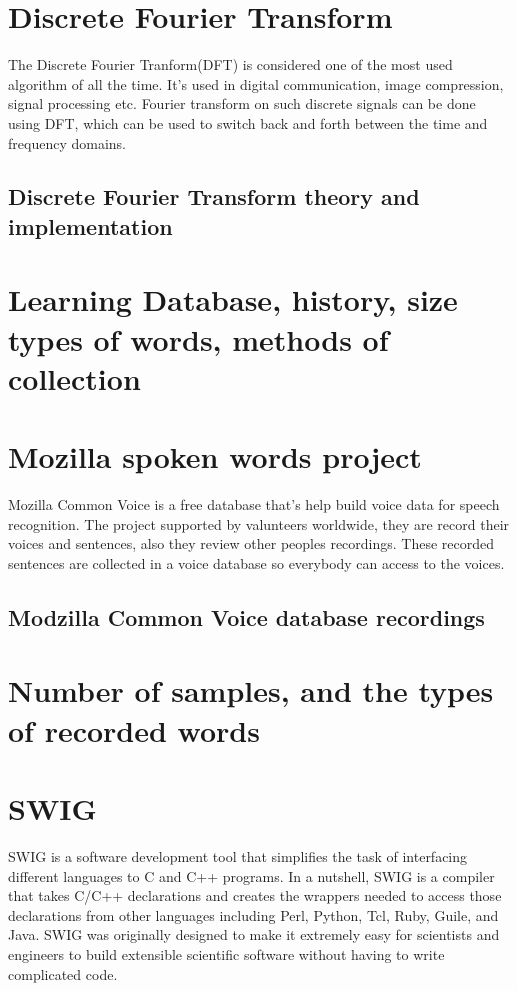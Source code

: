 \documentclass[english,12pt,oneside,a4paper]{article}
\begin{document}
\begin{center}
		\section{Discrete Fourier Transform}
		The Discrete Fourier Tranform(DFT) is considered one of the most used algorithm of all the time. It's used in digital communication, image compression, signal processing etc. Fourier transform on such discrete signals can be done using DFT, which can be used to switch back and forth between the time and frequency domains.
		\subsection{Discrete Fourier Transform theory and implementation}
		
		\section{Learning Database, history, size types of words, methods of collection}
		
		\section{Mozilla spoken words project}
		Mozilla Common Voice is a free database that's help build voice data for speech recognition. The project supported by valunteers worldwide, they are record their voices and sentences, also they review other peoples recordings. These recorded sentences are collected in a voice database so everybody can access to the voices.
		\subsection{Modzilla Common Voice database recordings}
		
		\section{Number of samples, and the types of recorded words}
		
		\section{SWIG}
		SWIG is a software development tool that simplifies the task of interfacing different languages to C and C++ programs. In a nutshell, SWIG is a compiler that takes C/C++ declarations and creates the wrappers needed to access those declarations from other languages including Perl, Python, Tcl, Ruby, Guile, and Java. SWIG was originally designed to make it extremely easy for scientists and engineers to build extensible scientific software without having to write complicated code.

\end{center}
\end{document}
